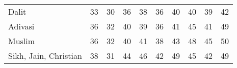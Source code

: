 \begin{tabular}{l*{9}{c}}
Dalit               &          33&          30&          36&          38&          36&          40&          40&          39&          42\\
Adivasi             &          36&          32&          40&          39&          36&          41&          45&          41&          49\\
Muslim              &          36&          32&          40&          41&          38&          43&          48&          45&          50\\
Sikh, Jain, Christian&          38&          31&          44&          46&          42&          49&          45&          42&          49\\
\bottomrule
\end{tabular}
